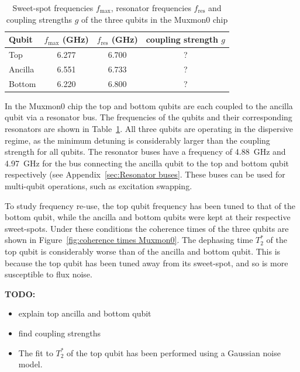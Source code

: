       \begin{table}
        \begin{tabular}{l c c c}
          \toprule
          Qubit  & $f_\text{max}$ (GHz) & $f_\text{res}$ (GHz) & coupling strength $g$ \\
          \midrule
          Top    & 6.277                & 6.700                & ?\\
          Ancilla& 6.551                & 6.733                & ? \\
          Bottom & 6.220                & 6.800                & ? \\
          \bottomrule
        \end{tabular}
        \caption{Sweet-spot frequencies $f_\text{max}$, resonator frequencies $f_\text{res}$ and coupling strengths $g$ of the three qubits in the Muxmon0 chip}
        \label{tab:Muxmon0 qubit properties}
      \end{table}
      In the Muxmon0 chip the top and bottom qubits are each coupled to the ancilla qubit via a resonator bus. The frequencies of the qubits and their corresponding resonators are shown in Table~\ref{tab:Muxmon0 qubit properties}. All three qubits are operating in the dispersive regime, as the minimum detuning is considerably larger than the coupling strength for all qubits. The resonator buses have a frequency of \SI{4.88}{\giga \hertz} and \SI{4.97}{\giga \hertz} for the bus connecting the ancilla qubit to the top and bottom qubit respectively (see Appendix~\ref{sec:Resonator buses}. These buses can be used for multi-qubit operations, such as excitation swapping.

      To study frequency re-use, the top qubit frequency has been tuned to that of the bottom qubit, while the ancilla and bottom qubits were kept at their respective sweet-spots. Under these conditions the coherence times of the three qubits are shown in Figure~\ref{fig:coherence times Muxmon0}. The dephasing time $T_2^*$ of the top qubit is considerably worse than of the ancilla and bottom qubit. This is because the top qubit has been tuned away from its sweet-spot, and so is more susceptible to flux noise.

      \textbf{TODO:}
      \begin{itemize}
        \item explain top ancilla and bottom qubit
        \item find coupling strengths
        \item  The fit to $T_2^*$ of the top qubit has been performed using a Gaussian noise model.
      \end{itemize}


